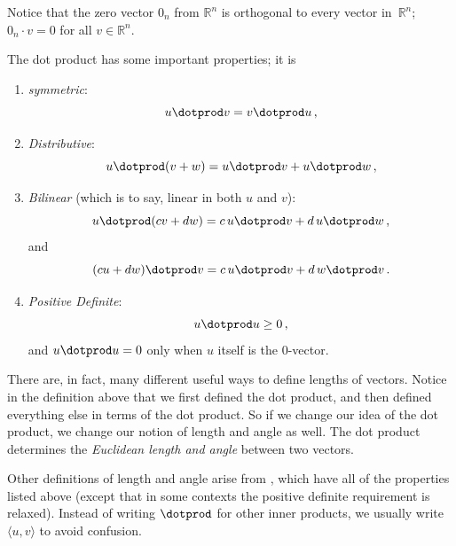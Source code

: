 Notice that the zero vector $0_n$ from $\mathbb{R}^n$ is orthogonal to every vector in~$\mathbb{R}^n$; $0_n\cdot v=0$ for all $v \in \mathbb{R}^n$.

\vspace{2mm}\noindent
The dot product has some important properties; it is
\begin{enumerate}
\item  \emph{symmetric}:  
\[u\dotprod v = v\dotprod u\, ,\]
\item \emph{Distributive}:  \[u\dotprod (v+w) = u\dotprod v + u\dotprod w\, ,\]
\item \emph{Bilinear} (which is to say, linear in both $u$ and $v$):  
\[ u\dotprod (cv+dw) = c \, u\dotprod v +d \, u\dotprod w\, ,\] and 
\[(cu+dw)\dotprod v = c\, u\dotprod v + d\, w\dotprod v\, .\]
\item \emph{Positive Definite}: \[u\dotprod u \geq 0\, ,\] and  $u\dotprod u = 0$ only when $u$ itself is the $0$-vector.
\end{enumerate}

There are, in fact, many different useful ways to define lengths of vectors.  Notice in the definition above that we first defined the dot product, and then defined everything else in terms of the dot product.  So if we change our idea of the dot product, we change our notion of length and angle as well.  The dot product determines the \emph{Euclidean length and angle} between two vectors.  

Other definitions of length and angle arise from , which have all of the properties listed above
(except that in some contexts the positive definite requirement is relaxed). Instead of writing $\dotprod$ for other inner products, we usually write $\langle u,v \rangle$ to avoid confusion.


